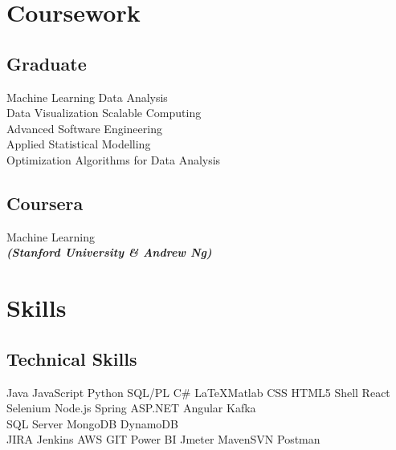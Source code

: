 \documentclass[]{aj-resume-openfont}
\begin{document}
\begin{minipage}[t]{0.33\textwidth}

\section{Coursework}
\subsection{Graduate}
\textbullet{} Machine Learning\textbullet{} Data Analysis\\
\textbullet{} Data Visualization\textbullet{} Scalable Computing\\
\textbullet{} Advanced Software Engineering\\
\textbullet{} Applied Statistical Modelling\\
\textbullet{} Optimization Algorithms for Data Analysis\\
\sectionsep

\subsection{Coursera}
Machine Learning \\
{\footnotesize \textit{\textbf{(Stanford University \& Andrew Ng) }}} \\
\sectionsep



\section{Skills}
\subsection{Technical Skills}
\textbullet{}Java \textbullet{}JavaScript \textbullet{}Python
\textbullet{}SQL/PL \textbullet{}C\# \textbullet{}\LaTeX \textbullet{}Matlab
\textbullet{}CSS \textbullet{}HTML5 \textbullet{}Shell
\textbullet{}React \textbullet{}Selenium \textbullet{}Node.js \textbullet{}Spring \textbullet{}ASP.NET \textbullet{}Angular \textbullet{}Kafka\\ 
\textbullet{}SQL Server \textbullet{}MongoDB \textbullet{}DynamoDB\\
\textbullet{}JIRA \textbullet{}Jenkins \textbullet{}AWS \textbullet{}GIT \textbullet{}Power BI \textbullet{}Jmeter \textbullet{}Maven\textbullet{}SVN  \textbullet{}Postman
\sectionsep

\end{minipage}
\end{document}
